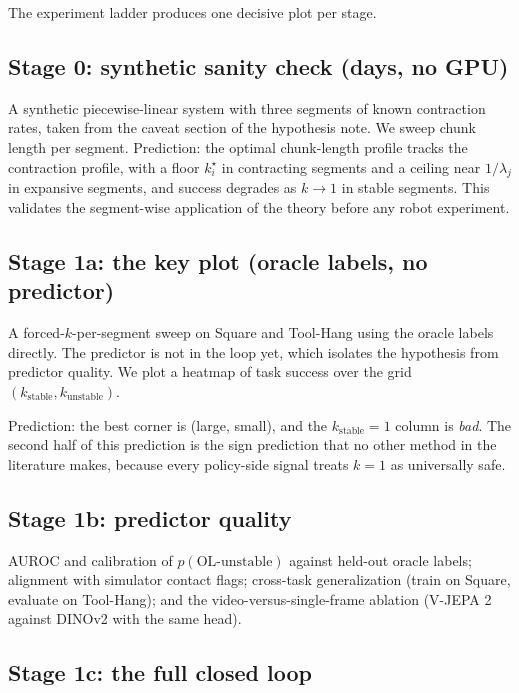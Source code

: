 \documentclass[11pt]{article}
\newcommand{\kstar}{k^{\star}}
\begin{document}
The experiment ladder produces one decisive plot per stage.

\subsection{Stage 0: synthetic sanity check (days, no GPU)}

A synthetic piecewise-linear system with three segments of known contraction rates,
taken from the caveat section of the hypothesis note. We sweep chunk length per segment.
Prediction: the optimal chunk-length profile tracks the contraction profile, with a
floor $\kstar_i$ in contracting segments and a ceiling near $1/\lambda_j$ in expansive
segments, and success degrades as $k \to 1$ in stable segments. This validates the
segment-wise application of the theory before any robot experiment.

\subsection{Stage 1a: the key plot (oracle labels, no predictor)}

A forced-$k$-per-segment sweep on Square and Tool-Hang using the oracle labels directly.
The predictor is not in the loop yet, which isolates the hypothesis from predictor
quality. We plot a heatmap of task success over the grid
$(k_{\mathrm{stable}}, k_{\mathrm{unstable}})$.

Prediction: the best corner is (large, small), and the $k_{\mathrm{stable}} = 1$ column
is \emph{bad}. The second half of this prediction is the sign prediction that no other
method in the literature makes, because every policy-side signal treats $k=1$ as
universally safe.

\subsection{Stage 1b: predictor quality}

AUROC and calibration of $p(\text{OL-unstable})$ against held-out oracle labels;
alignment with simulator contact flags; cross-task generalization (train on Square,
evaluate on Tool-Hang); and the video-versus-single-frame ablation (V-JEPA 2 against
DINOv2 with the same head).

\subsection{Stage 1c: the full closed loop}
\end{document}
